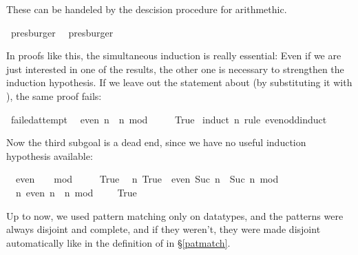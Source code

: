 \begin{isabellebody}
\begin{isamarkuptxt}
  \noindent These can be handeled by the descision procedure for
  arithmethic.%
\end{isamarkuptxt}%
\isamarkuptrue%
\isamarkupfalse%
\ presburger\ %
\isanewline
{}\isamarkupfalse%
\ presburger\isanewline
{}\isamarkupfalse%
%
\endisatagproof
{\isafoldproof}%
%
\isadelimproof
%
\endisadelimproof
%
\begin{isamarkuptext}%
In proofs like this, the simultaneous induction is really essential:
  Even if we are just interested in one of the results, the other
  one is necessary to strengthen the induction hypothesis. If we leave
  out the statement about  (by substituting it with ), the same proof fails:%
\end{isamarkuptext}%
\isamarkuptrue%
\isamarkupfalse%
\ failed{\isacharunderscore}attempt{\isacharcolon}\isanewline
\ \ {\isachardoublequoteopen}even\ n\ {\isacharequal}\ {\isacharparenleft}n\ mod\ {}\ {\isacharequal}\ {}{\isacharparenright}{\isachardoublequoteclose}\isanewline
\ \ {\isachardoublequoteopen}True{\isachardoublequoteclose}\isanewline
%
\isadelimproof
%
\endisadelimproof
%
\isatagproof
{}\isamarkupfalse%
\ {\isacharparenleft}induct\ n\ rule{\isacharcolon}\ even{\isacharunderscore}odd{\isachardot}induct{\isacharparenright}%
\begin{isamarkuptxt}%
\noindent Now the third subgoal is a dead end, since we have no
  useful induction hypothesis available:

  \begin{isabelle}%
\ {}{\isachardot}\ even\ {}\ {\isacharequal}\ {\isacharparenleft}{}\ mod\ {}\ {\isacharequal}\ {}{\isacharparenright}\isanewline
\ {}{\isachardot}\ True\isanewline
\ {}{\isachardot}\ {\isasymAnd}n{\isachardot}\ True\ {\isasymLongrightarrow}\ even\ {\isacharparenleft}Suc\ n{\isacharparenright}\ {\isacharequal}\ {\isacharparenleft}Suc\ n\ mod\ {}\ {\isacharequal}\ {}{\isacharparenright}\isanewline
\ {}{\isachardot}\ {\isasymAnd}n{\isachardot}\ even\ n\ {\isacharequal}\ {\isacharparenleft}n\ mod\ {}\ {\isacharequal}\ {}{\isacharparenright}\ {\isasymLongrightarrow}\ True%
\end{isabelle}%
\end{isamarkuptxt}%
\isamarkuptrue%
\isamarkupfalse%
%
\endisatagproof
{\isafoldproof}%
%
\isadelimproof
%
\endisadelimproof
%
\isamarkuptrue%
%
\isamarkuptrue%
%
\begin{isamarkuptext}%
Up to now, we used pattern matching only on datatypes, and the
  patterns were always disjoint and complete, and if they weren't,
  they were made disjoint automatically like in the definition of
   in \S\ref{patmatch}.


\end{isamarkuptext}
\end{isabellebody}
